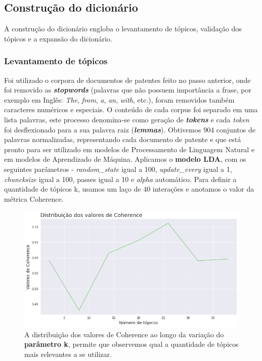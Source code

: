 \subsection{Construção do dicionário}

A construção do dicionário engloba o levantamento de tópicos, validação dos tópicos e a expansão do dicionário.

\subsubsection{Levantamento de tópicos}

Foi utilizado o corpora de documentos de patentes feito no passo anterior, onde foi removido as \textbf{\textit{stopwords}} (palavras que não possuem importância a frase, por exemplo em Inglês: \textit{The}, \textit{from}, \textit{a}, \textit{an}, \textit{with}, etc.), foram removidos também caracteres numéricos e especiais. O conteúdo de cada corpus foi separado em uma lista palavras, este processo denomina-se como geração de \textbf{\textit{tokens}} e cada \textit{token} foi desflexionado para a sua palavra raiz (\textbf{\textit{lemmas}}). Obtivemos 904 conjuntos de palavras normalizadas, representando cada documento de patente e que está pronto para ser utilizado em modelos de Processamento de Linguagem Natural e em modelos de Aprendizado de Máquina.
Aplicamos o \textbf{modelo LDA}, com os seguintes parâmetros - \textit{random\_state} igual a 100, \textit{update\_every} igual a 1, \textit{chuncksize} igual a 100, passes igual a 10 e \textit{alpha} automático. Para definir a quantidade de tópicos k, usamos um laço de 40 interações e anotamos o valor da métrica Coherence.

\begin{figure}[ht!]
	\centering
	\includegraphics[scale=0.6]{imagens/distr_dos_valores_de_coherence.png}
	\caption{A distribuição dos valores de Coherence ao longo da variação do \textbf{parâmetro k}, permite que observemos qual a quantidade de tópicos mais relevantes a se utilizar.
			 \label{dist_coherence_image}}
\end{figure}

